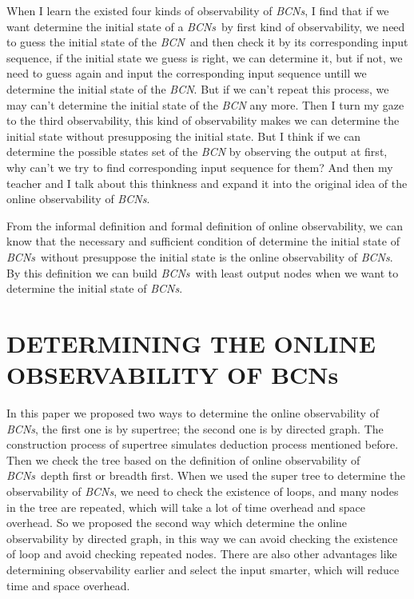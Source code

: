 \documentclass[conference]{IEEEtran} %
\def \BCN {{\em BCN}}
\def \BCNs {{\em BCNs}}
\begin{document}
When I learn the existed four kinds of observability of {\em BCNs}, I find that if we want determine the initial state of a \BCNs\ by first kind of observability, we need to guess the initial state of the \BCN\ and then check it by its corresponding input sequence, if the initial state we guess is right, we can determine it, but if not, we need to guess again and input the corresponding input sequence untill we determine the initial state of the {\em BCN}. But if we can't repeat this process, we may can't determine the initial state of the {\em BCN} any more. Then I turn my gaze to the third observability, this kind of observability makes we can determine the initial state without presupposing the initial state. But I think if we can determine the possible states set of the {\em BCN} by observing the output at first, why can't we try to find corresponding input sequence for them? And then my teacher and I talk about this thinkness and expand it into the original idea of the online observability of {\em BCNs}. 

From the informal definition and formal definition of online observability, we can know that the necessary and sufficient condition of determine the initial state of \BCNs\ without presuppose the initial state is the online observability of {\em BCNs}. By this definition we can build \BCNs\ with least output nodes when we want to determine the initial state of {\em BCNs}.
\section{DETERMINING THE ONLINE OBSERVABILITY OF BCNs}

In this paper we proposed two ways to determine the online observability of {\em BCNs}, the first one is by supertree; the second one is by directed graph. The construction process of supertree simulates deduction process mentioned before. Then we check the tree based on the definition of online observability of \BCNs\ depth first or breadth first. When we used the super tree to determine the observability of {\em BCNs}, we need to check the existence of loops, and many nodes in the tree are repeated, which will take a lot of time overhead and space overhead. So we proposed the second way which determine the online observability by directed graph,   in this way we can avoid checking the existence of loop and avoid checking repeated nodes. There are also other advantages like determining observability earlier and select the input smarter, which will reduce time and space overhead.    
\end{document}
